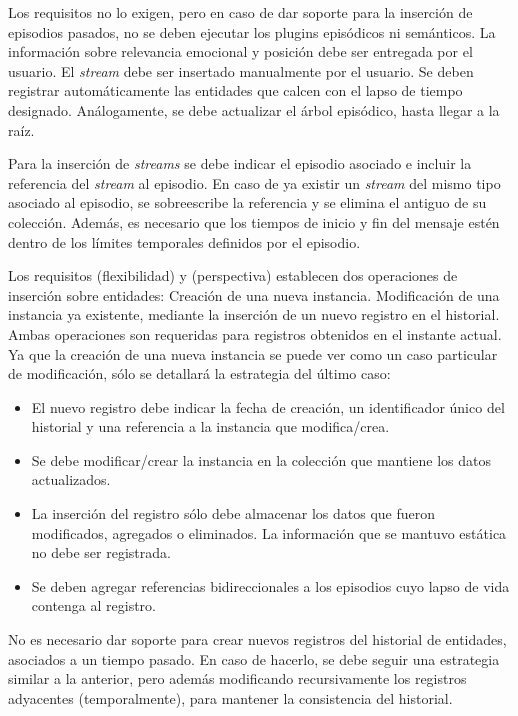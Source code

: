 Los requisitos no lo exigen, pero en caso de dar soporte para la inserción de episodios pasados, no se deben ejecutar los plugins episódicos ni semánticos. La información sobre relevancia emocional y posición debe ser entregada por el usuario. El \textit{stream} debe ser insertado manualmente por el usuario. Se deben registrar automáticamente las entidades que calcen con el lapso de tiempo designado. Análogamente, se debe actualizar el árbol episódico, hasta llegar a la raíz.

Para la inserción de \textit{streams} se debe indicar el episodio asociado e incluir la referencia del \textit{stream} al episodio. En caso de ya existir un \textit{stream} del mismo tipo asociado al episodio, se sobreescribe la referencia y se elimina el antiguo de su colección. Además, es necesario que los tiempos de inicio y fin del mensaje estén dentro de los límites temporales definidos por el episodio.

Los requisitos  (flexibilidad) y  (perspectiva) establecen dos operaciones de inserción sobre entidades: Creación de una nueva instancia. Modificación de una instancia ya existente, mediante la inserción de un nuevo registro en el historial. Ambas operaciones son requeridas para registros obtenidos en el instante actual. Ya que la creación de una nueva instancia se puede ver como un caso particular de modificación, sólo se detallará la estrategia del último caso:
\begin{itemize}
\item El nuevo registro debe indicar la fecha de creación, un identificador único del historial y una referencia a la instancia que modifica/crea.
\item Se debe modificar/crear la instancia en la colección que mantiene los datos actualizados.
\item La inserción del registro sólo debe almacenar los datos que fueron modificados, agregados o eliminados. La información que se mantuvo estática no debe ser registrada.
\item Se deben agregar referencias bidireccionales a los episodios cuyo lapso de vida contenga al registro.
\end{itemize}

No es necesario dar soporte para crear nuevos registros del historial de entidades, asociados a un tiempo pasado. En caso de hacerlo, se debe seguir una estrategia similar a la anterior, pero además modificando recursivamente los registros adyacentes (temporalmente), para mantener la consistencia del historial.

